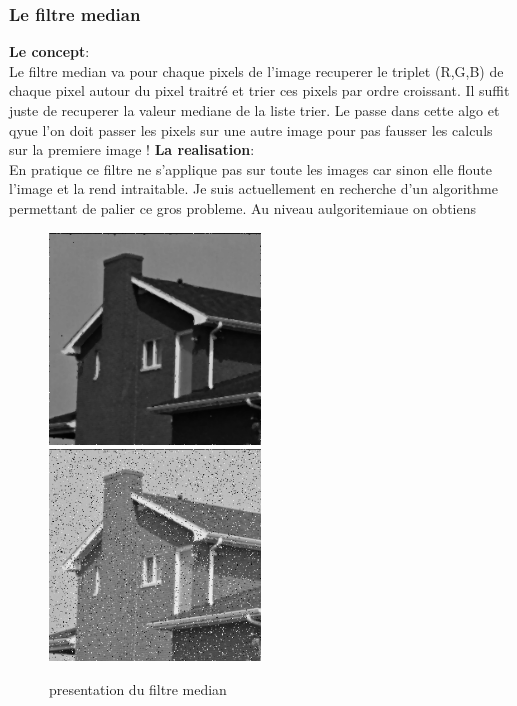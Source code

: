 \documentclass[12pt]{article}
\begin{document}
\subsubsection{Le filtre median}
\textbf{Le concept}:\\
Le filtre median va pour chaque pixels de l'image recuperer le triplet (R,G,B) de chaque pixel autour du pixel traitré et trier ces pixels par ordre croissant. Il suffit juste de recuperer la valeur mediane de la liste trier. Le passe dans cette algo et qyue l'on doit passer les pixels sur une autre image pour pas fausser les calculs sur la premiere image !
\vspace{0.8cm}
\textbf{La realisation}:\\
En pratique ce filtre ne s'applique pas sur toute les images car sinon elle floute l'image et la rend intraitable. Je suis actuellement en recherche d'un algorithme permettant de palier ce gros probleme. Au niveau aulgoritemiaue on obtiens
\vspace{0.8cm}
\begin{figure}[h]
\includegraphics[width=0.50\textwidth]{img/house.png}
\includegraphics[width=0.50\textwidth]{img/house.jpg}
\caption{presentation du filtre median}
\end{figure}
\newpage
\end{document}
